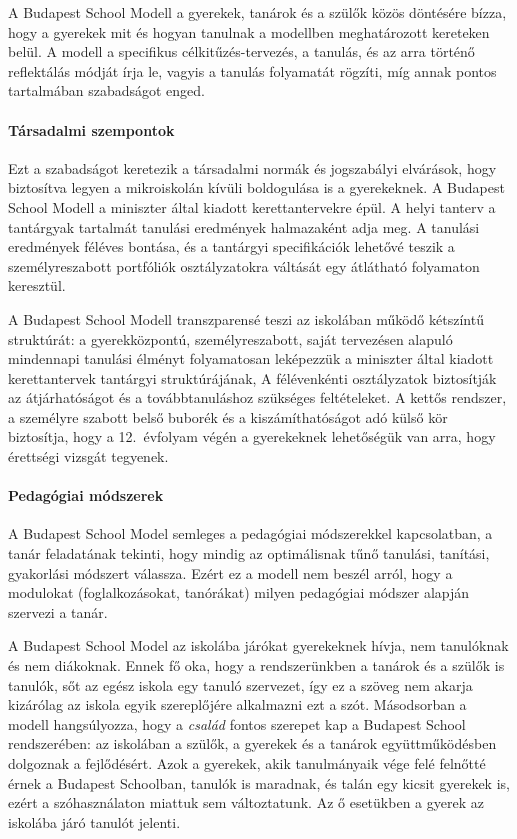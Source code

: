 A Budapest School Modell a gyerekek, tanárok és a szülők közös döntésére bízza, hogy a gyerekek mit és hogyan tanulnak a modellben meghatározott kereteken belül. A modell a specifikus célkitűzés-tervezés, a tanulás, és az arra történő reflektálás módját írja le, vagyis a tanulás folyamatát rögzíti, míg annak pontos tartalmában szabadságot enged.

\paragraph{Társadalmi szempontok}  Ezt a szabadságot keretezik a társadalmi normák és jogszabályi elvárások, hogy biztosítva legyen a mikroiskolán kívüli boldogulása is a gyerekeknek. A Budapest School Modell
 a miniszter által kiadott kerettantervekre \citep{ofi:kerettanterv} épül. A helyi tanterv a tantárgyak tartalmát tanulási eredmények halmazaként adja meg. A tanulási eredmények féléves bontása, és a tantárgyi specifikációk lehetővé teszik a személyreszabott portfóliók osztályzatokra váltását egy átlátható folyamaton keresztül.

A Budapest School Modell transzparensé teszi az iskolában működő kétszíntű struktúrát: a gyerekközpontú, személyreszabott, saját tervezésen alapuló mindennapi tanulási élményt folyamatosan leképezzük a miniszter által kiadott kerettantervek tantárgyi struktúrájának, A félévenkénti osztályzatok biztosítják az átjárhatóságot és a továbbtanuláshoz szükséges feltételeket. A kettős rendszer, a személyre szabott belső buborék és a kiszámíthatóságot adó külső kör biztosítja, hogy a 12.~évfolyam végén a gyerekeknek lehetőségük van arra, hogy érettségi vizsgát tegyenek.

\paragraph{Pedagógiai módszerek}
A Budapest School Model semleges a pedagógiai módszerekkel kapcsolatban, a tanár feladatának tekinti, hogy mindig az optimálisnak tűnő tanulási, tanítási, gyakorlási módszert válassza. Ezért ez a modell nem beszél arról, hogy a modulokat (foglalkozásokat, tanórákat) milyen pedagógiai módszer alapján szervezi a tanár.

A Budapest School Model az iskolába járókat gyerekeknek hívja, nem tanulóknak és nem diákoknak. Ennek fő oka, hogy a rendszerünkben a tanárok és a szülők is tanulók, sőt az egész iskola egy tanuló szervezet, így ez a szöveg nem akarja  kizárólag az iskola egyik szereplőjére alkalmazni ezt a szót. Másodsorban a modell hangsúlyozza, hogy a \emph{család} fontos szerepet kap a Budapest School rendszerében: az iskolában a szülők, a gyerekek és a tanárok együttműködésben dolgoznak a fejlődésért. Azok a gyerekek, akik tanulmányaik vége felé felnőtté érnek a Budapest Schoolban, tanulók is maradnak, és talán egy kicsit gyerekek is, ezért a szóhasználaton miattuk sem változtatunk. Az ő esetükben a gyerek az iskolába járó tanulót jelenti.


